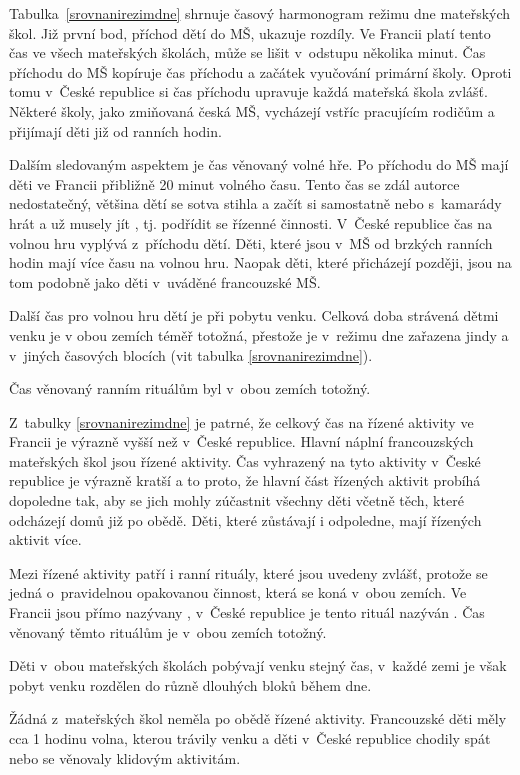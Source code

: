 	Tabulka~\ref{srovnanirezimdne} shrnuje časový harmonogram režimu dne mateřských škol. Již první bod, příchod dětí do MŠ, ukazuje rozdíly. Ve Francii platí tento čas ve všech mateřských školách, může se lišit v~odstupu několika minut. Čas příchodu do MŠ kopíruje čas příchodu a začátek vyučování primární školy. Oproti tomu v~České republice si čas příchodu upravuje každá mateřská škola zvlášť. Některé školy, jako zmiňovaná česká MŠ, vycházejí vstříc pracujícím rodičům a přijímají děti již od ranních hodin.

	Dalším sledovaným aspektem je čas věnovaný volné hře. Po příchodu do MŠ mají děti ve Francii přibližně 20 minut volného času. Tento čas se zdál autorce nedostatečný, většina dětí se sotva stihla  a začít si samostatně nebo s~kamarády hrát a už musely jít , tj. podřídit se řízenné činnosti. V~České republice čas na volnou hru vyplývá z~příchodu dětí. Děti, které jsou v~MŠ od brzkých ranních hodin mají více času na volnou hru. Naopak děti, které přicházejí později, jsou na tom podobně jako děti v~uváděné francouzské MŠ. 

	Další čas pro volnou hru dětí je při pobytu venku. Celková doba strávená dětmi venku je v obou zemích téměř totožná, přestože je v~režimu dne zařazena jindy a v~jiných časových blocích (vit tabulka \ref{srovnanirezimdne}).

	Čas věnovaný ranním rituálům byl v~obou zemích totožný. 

	Z~tabulky \ref{srovnanirezimdne} je patrné, že celkový čas na řízené aktivity ve Francii je výrazně vyšší než v~České republice. Hlavní náplní francouzských mateřských škol jsou řízené aktivity. Čas vyhrazený na tyto aktivity v~České republice je výrazně kratší a to proto, že hlavní část řízených aktivit probíhá dopoledne tak, aby se jich mohly zúčastnit všechny děti včetně těch, které odcházejí domů již po obědě. Děti, které zůstávají i odpoledne, mají řízených aktivit více. 

	Mezi řízené aktivity patří i ranní rituály, které jsou uvedeny zvlášť, protože se jedná o~pravidelnou opakovanou činnost, která se koná v~obou zemích. Ve Francii jsou přímo nazývany , v~České republice je tento rituál nazýván . Čas věnovaný těmto rituálům je v~obou zemích totožný.

	Děti v~obou mateřských školách pobývají venku stejný čas, v~každé zemi je však pobyt venku rozdělen do různě dlouhých bloků během dne. 

	Žádná z~mateřských škol neměla po obědě řízené aktivity. Francouzské děti měly cca 1 hodinu volna, kterou trávily venku a děti v~České republice chodily spát nebo se věnovaly klidovým aktivitám. 

